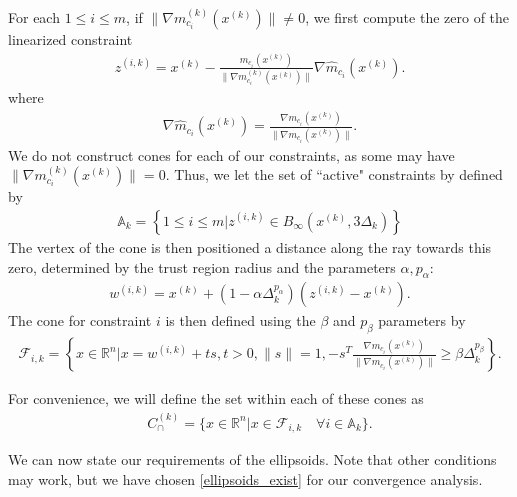 \documentclass{article}
\theoremstyle{case}
\newcommand{\activeconstraintsk}{{\mathbb A_{k}}}
\newcommand{\capcones}{{C^{(k)}_{\cap}}}
\newcommand{\dk}{\Delta_k}
\newcommand{\fik}{{\mathcal F_{i, k}}}
\newcommand{\gmcik}{{\nabla m_{c_i}^{(k)}\left(\xk\right)}}
\newcommand{\hgik}{{\frac{\nabla m_{c_i}(\xk)}{\|\nabla m_{c_i}(\xk)\|}}}
\newcommand{\hgmcik}{{\nabla \hat m_{c_i}(\xk)}}
\newcommand{\Rn}{\mathbb R^n}
\newcommand{\wik}{{w^{(i, k)}}}
\newcommand{\xk}{{x^{(k)}}}
\newcommand{\zik}{{z^{(i, k)}}}
\begin{document}
For each $1\le i\le m$, if $\|\gmcik\| \ne 0$, we first compute the zero of the linearized constraint
\begin{align}
\zik = \xk - \frac{m_{c_i}(\xk)}{\|\gmcik\|} \hgmcik. \label{define_z}
\end{align}
where
\begin{align}
\hgmcik = \frac{\nabla m_{c_i}(\xk)}{\|\nabla m_{c_i}(\xk)\|}. \label{define_normalized_gradient}
\end{align}
We do not construct cones for each of our constraints, as some may have $\|\gmcik\| = 0$.
Thus, we let the set of ``active" constraints by defined by 
\begin{align}
\activeconstraintsk = \left\{1 \le i \le m | \zik \in B_{\infty}(\xk, 3\dk)\right\} \label{define_activeconstraints}
\end{align}
The vertex of the cone is then positioned a distance along the ray towards this zero, determined by the trust region radius and the parameters $\alpha, p_{\alpha}$:
\begin{align}
\wik = \xk + \left(1 - \alpha\dk^{p_{\alpha}}\right)\left(\zik - \xk\right). \label{define_w}
\end{align}
The cone for constraint $i$ is then defined using the $\beta$ and $p_{\beta}$ parameters by
\begin{align}
\fik = \left\{x \in \Rn | x = \wik + t s,t > 0, \|s\| = 1, -s^T\hgik \ge \beta \dk^{p_{\beta}} \right\}. \label{define_fik}
\end{align}

For convenience, we will define the set within each of these cones as
\begin{align}
\label{define_capcones}
\capcones = \{x\in\Rn | x \in \fik \quad \forall i \in \activeconstraintsk \}.
\end{align}




We can now state our requirements of the ellipsoids.
Note that other conditions may work, but we have chosen \cref{ellipsoids_exist} for our convergence analysis.
\end{document}
